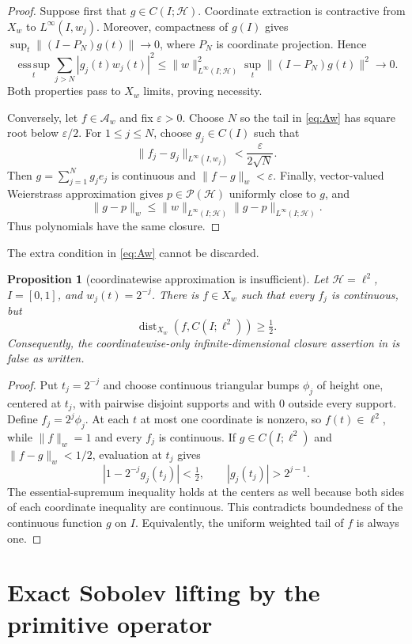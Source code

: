 \documentclass[11pt]{article}
\newtheorem{proposition}[theorem]{Proposition}
\newcommand{\Hh}{\mathcal H}
\newcommand{\Pw}{\mathcal P(\Hh)}
\newcommand{\Aw}{\mathcal A_w}
\newcommand{\esssup}{\operatorname*{ess\,sup}}
\begin{document}
\begin{proof}
Suppose first that $g\in C(I;\Hh)$.  Coordinate extraction is contractive
from $X_w$ to $L^\infty(I,w_j)$.  Moreover, compactness of $g(I)$ gives
$\sup_t\|(I-P_N)g(t)\|\to0$, where $P_N$ is coordinate projection.  Hence
\[
 \esssup_t\sum_{j>N}|g_j(t)w_j(t)|^2
 \le \|w\|_{L^\infty(I;\Hh)}^2
       \sup_t\|(I-P_N)g(t)\|^2\longrightarrow0.
\]
Both properties pass to $X_w$ limits, proving necessity.

Conversely, let $f\in\Aw$ and fix $\varepsilon>0$.  Choose $N$ so the
tail in \eqref{eq:Aw} has square root below $\varepsilon/2$.  For
$1\le j\le N$, choose $g_j\in C(I)$ such that
\[
 \|f_j-g_j\|_{L^\infty(I,w_j)}<\frac{\varepsilon}{2\sqrt N}.
\]
Then $g=\sum_{j=1}^Ng_je_j$ is continuous and $\|f-g\|_w<\varepsilon$.
Finally, vector-valued Weierstrass approximation gives $p\in\Pw$ uniformly
close to $g$, and
\[
 \|g-p\|_w\le \|w\|_{L^\infty(I;\Hh)}\|g-p\|_{L^\infty(I;\Hh)}.
\]
Thus polynomials have the same closure.
\end{proof}

The extra condition in \eqref{eq:Aw} cannot be discarded.

\begin{proposition}[coordinatewise approximation is insufficient]
Let $\Hh=\ell^2$, $I=[0,1]$, and $w_j(t)=2^{-j}$.  There is
$f\in X_w$ such that every $f_j$ is continuous, but
\[
 \operatorname{dist}_{X_w}(f,C(I;\ell^2))\ge\tfrac12.
\]
Consequently, the coordinatewise-only infinite-dimensional closure
assertion in \cite{Q} is false as written.
\end{proposition}

\begin{proof}
Put $t_j=2^{-j}$ and choose continuous triangular bumps $\phi_j$ of height
one, centered at $t_j$, with pairwise disjoint supports and with
$0$ outside every support.  Define $f_j=2^j\phi_j$.  At each $t$ at most
one coordinate is nonzero, so $f(t)\in\ell^2$, while $\|f\|_w=1$ and every
$f_j$ is continuous.  If $g\in C(I;\ell^2)$ and $\|f-g\|_w<1/2$, evaluation
at $t_j$ gives
\[
 |1-2^{-j}g_j(t_j)|<\tfrac12,\qquad
 |g_j(t_j)|>2^{j-1}.
\]
The essential-supremum inequality holds at the centers as well because both
sides of each coordinate inequality are continuous.  This contradicts
boundedness of the continuous function $g$ on $I$.
Equivalently, the uniform weighted tail of $f$ is always one.
\end{proof}

\section{Exact Sobolev lifting by the primitive operator}
\end{document}
